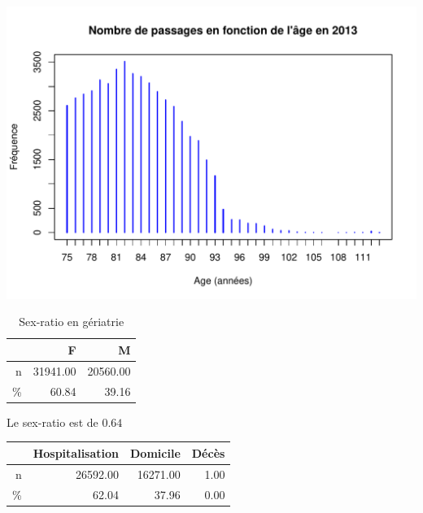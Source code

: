 \documentclass[12pt,english,french,twoside]{book}\usepackage[]{graphicx}\usepackage[]{color}
\makeatletter
\def\maxwidth{ %
  \ifdim\Gin@nat@width>\linewidth
    \linewidth
  \else
    \Gin@nat@width
  \fi
}
\newenvironment{knitrout}{}{} %
\makeatother
\begin{document}

\begin{knitrout}
\color{fgcolor}
\includegraphics[width=\maxwidth]{figure/passages_geriatrie} 

\end{knitrout}



\begin{table}[ht]
\centering
\begin{tabular}{rrr}
  \hline
 & F & M \\ 
  \hline
n & 31941.00 & 20560.00 \\ 
  \% & 60.84 & 39.16 \\ 
   \hline
\end{tabular}
\caption[Sex-ratio en gériatrie]{Sex-ratio en gériatrie} 
\label{tab:ger_sr}
\end{table}




Le sex-ratio est de $0.64$


\begin{table}[ht]
\centering
\begin{tabular}{rrrr}
  \hline
 & Hospitalisation & Domicile & Décès \\ 
  \hline
n & 26592.00 & 16271.00 & 1.00 \\ 
  \% & 62.04 & 37.96 & 0.00 \\ 
   \hline
\end{tabular}
\end{table}
\end{document}
